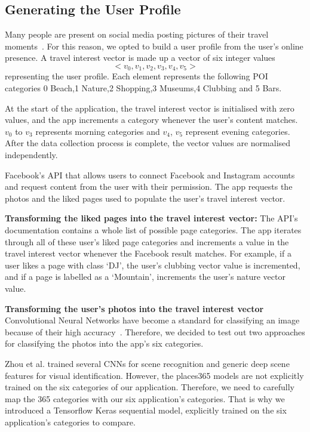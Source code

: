 \subsection{Generating the User Profile}

Many people are present on social media posting
pictures of their travel moments~\cite{Miller2016}. For this reason, we opted to
build a user profile from the user's online presence. A travel interest vector is made up a vector of six integer values
\[<v_0, v_1, v_2, v_3, v_4, v_5>\] representing the user profile.
Each element represents the following POI categories 0 Beach,1 Nature,2
Shopping,3 Museums,4 Clubbing and 5 Bars.
    

At the start of the application, the
travel interest vector is initialised with zero
values, and the app increments a category whenever the
user's content matches. $v_0$ to $v_3$ represents morning categories
and $v_4$, $v_5$ represent evening categories. After
the data collection process is complete, the
vector values are normalised independently. 

Facebook's API that allows users to connect Facebook
and Instagram accounts and request content from the user with their permission.
The app requests the photos and the liked pages used to 
populate the user's travel interest
vector. 

\noindent \textbf{Transforming the liked pages into the travel interest vector: } The API's documentation contains a whole list of possible
page categories. 
The app iterates through all of these user's liked
page categories and increments a value in the travel
interest vector whenever the Facebook result matches.
For example, if a user likes a page with class `DJ',
the user's clubbing vector value is incremented, and if a page is labelled as a
`Mountain', increments the user's nature vector value.

\noindent \textbf{Transforming the user's photos into the travel interest
vector} Convolutional Neural Networks have become a standard
for classifying an image because of their high
accuracy~\cite{Zhou2018}. Therefore, we decided to test
out two approaches for classifying the photos into the
app's six categories. 

Zhou et al. \cite{Zhou2018} trained several CNNs for
scene recognition and generic deep scene features for
visual identification. However, the places365 models
are not explicitly trained on the six categories of
our application. Therefore, we need to carefully map
the 365 categories with our six application's
categories. That is why we introduced a Tensorflow
Keras sequential model, explicitly trained on the six
application's categories to compare.


